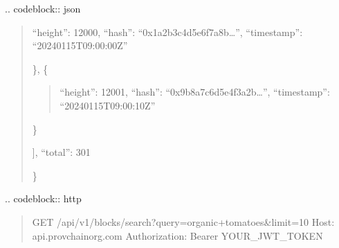 \documentclass[letterpaper,10pt,english]{sphinxmanual}
\begin{document}
\sphinxAtStartPar
{}
.. code\sphinxhyphen{}block:: json
\begin{quote}
\begin{description}
\sphinxlineitem{\{}\begin{description}
\sphinxlineitem{“blocks”: {[}}\begin{description}
\sphinxlineitem{\{}
\sphinxAtStartPar
“height”: 12000,
“hash”: “0x1a2b3c4d5e6f7a8b…”,
“timestamp”: “2024\sphinxhyphen{}01\sphinxhyphen{}15T09:00:00Z”

\end{description}

\sphinxAtStartPar
\},
\{
\begin{quote}

\sphinxAtStartPar
“height”: 12001,
“hash”: “0x9b8a7c6d5e4f3a2b…”,
“timestamp”: “2024\sphinxhyphen{}01\sphinxhyphen{}15T09:00:10Z”
\end{quote}

\sphinxAtStartPar
\}

\end{description}

\sphinxAtStartPar
{]},
“total”: 301

\end{description}

\sphinxAtStartPar
\}
\end{quote}

\sphinxAtStartPar
{}
.. code\sphinxhyphen{}block:: http
\begin{quote}

\sphinxAtStartPar
GET /api/v1/blocks/search?query=organic+tomatoes\&limit=10
Host: api.provchain\sphinxhyphen{}org.com
Authorization: Bearer YOUR\_JWT\_TOKEN
\end{quote}
\end{document}
